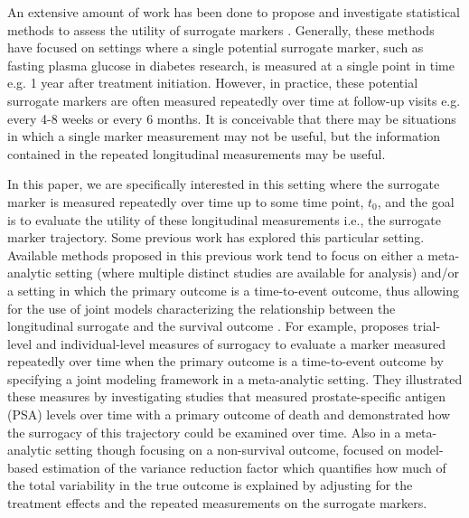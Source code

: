 \documentclass[useAMS,usenatbib,referee]{biom}
\begin{document}
An extensive amount of work has been done to propose and investigate statistical methods to assess the utility of surrogate markers  \citep{prentice1989surrogate,freedman1992statistical,burzykowski2005evaluation,wang2002measure,gilbert2008evaluating,parast2016robust}. Generally, these methods have focused on settings where a single potential surrogate marker, such as fasting plasma glucose in diabetes research, is measured at a single point in time e.g. 1 year after treatment initiation. However, in practice, these potential surrogate markers are often measured repeatedly over time at follow-up visits e.g. every 4-8 weeks or every 6 months. It is conceivable that there may be situations in which a single marker measurement may not be useful, but the information contained in the repeated longitudinal measurements may be useful. 

In this paper, we are specifically interested in this setting where the surrogate marker is measured repeatedly over time up to some time point, $t_0$, and the goal is to evaluate the utility of these longitudinal measurements i.e., the surrogate marker trajectory. Some previous work has explored this particular setting. Available methods proposed in this previous work tend to focus on either a meta-analytic setting (where multiple distinct studies are available for analysis) and/or a setting in which the primary outcome is a time-to-event outcome, thus allowing for the use of joint models characterizing the relationship between the longitudinal surrogate and the survival outcome \citep{renard2003validation,pryseley2010using,deslandes2007assessing,taylor2002surrogate,tsiatis1995modeling,henderson2002identification}. For example, \cite{renard2003validation} proposes trial-level and individual-level measures of surrogacy to evaluate a marker measured repeatedly over time when the primary outcome is a time-to-event outcome by specifying a joint modeling framework in a meta-analytic setting. They illustrated these measures by investigating studies that measured prostate-specific antigen (PSA) levels over time with a primary outcome of death and demonstrated how the surrogacy of this trajectory could be examined over time. Also in a meta-analytic setting though focusing on a non-survival outcome, \cite{pryseley2010using} focused on model-based estimation of the variance reduction factor which quantifies how much of the total variability in the true outcome is explained by adjusting for the treatment effects and the repeated measurements on the surrogate markers. 
\end{document}

